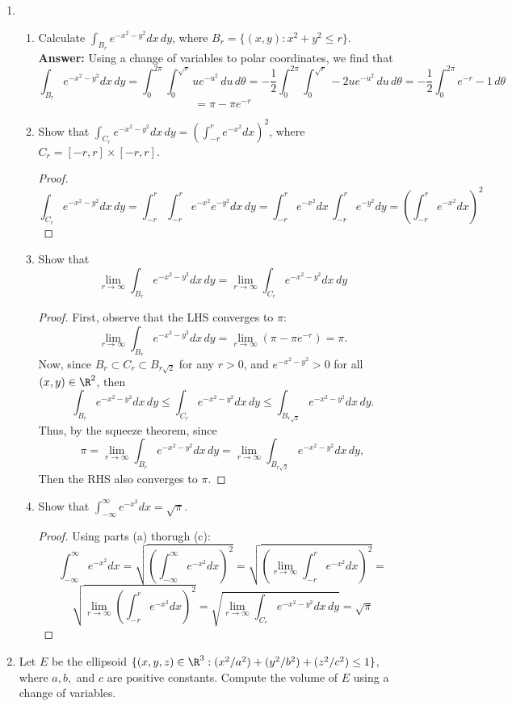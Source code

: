 \documentclass[letterpaper]{article}
\begin{document}
\begin{enumerate}
\pagebreak
\item \begin{enumerate}
\item Calculate $\int_{B_r} e^{-x^2-y^2} dx \, dy$, where $B_r=\{(x,y): x^2+y^2\leq r\}$. \\
\textbf{Answer:} Using a change of variables to polar coordinates, we find that 
$$\int_{B_r} e^{-x^2-y^2} dx \, dy = \int_0^{2\pi}\int_0^{\sqrt{r}}u e^{-u^2}\, du\, d\theta = -\frac{1}{2} \int_0^{2\pi}\int_0^{\sqrt{r}}-2u e^{-u^2}\, du\, d\theta= -\frac{1}{2} \int_0^{2\pi} e^{-r}-1\, d\theta$$
$$=\pi-\pi e^{-r}$$
\item Show that $\int_{C_r} e^{-x^2-y^2} dx \, dy = (\int_{-r}^r e^{-x^2} dx)^2$, where $C_r=[-r,r]\times[-r,r]$. 
\begin{proof}
$$\int_{C_r} e^{-x^2-y^2} dx \, dy = \int_{-r}^r\int_{-r}^r e^{-x^2}e^{-y^2} dx \, dy= \int_{-r}^r e^{-x^2} dx\, \int_{-r}^r e^{-y^2} dy=\left(\int_{-r}^r e^{-x^2} dx\right)^2$$
\end{proof}
\item Show that 
$$\lim_{r\to\infty} \int_{B_r} e^{-x^2-y^2} dx \, dy = \lim_{r\to\infty} \int_{C_r} e^{-x^2-y^2} dx \, dy$$
\begin{proof} First, observe that the LHS converges to $\pi$:
$$\lim_{r\to\infty} \int_{B_r} e^{-x^2-y^2} dx \, dy = \lim_{r\to\infty} \left(\pi-\pi e^{-r}\right) = \pi.$$
Now, since $B_r\subset C_r\subset B_{r\sqrt{2}}$ for any $r>0$, and $e^{-x^2-y^2}>0$ for all $(x,y)\in\R^2$, then 
$$\int_{B_r} e^{-x^2-y^2} dx \, dy \leq \int_{C_r} e^{-x^2-y^2} dx \, dy \leq \int_{B_{r\sqrt{2}}} e^{-x^2-y^2} dx \, dy.$$
Thus, by the squeeze theorem, since 
$$\pi = \lim_{r\to\infty} \int_{B_r} e^{-x^2-y^2} dx \, dy =\lim_{r\to\infty} \int_{B_{r\sqrt{2}}} e^{-x^2-y^2} dx \, dy,$$
Then the RHS also converges to $\pi$. 
\end{proof}
\item Show that $\int_{-\infty}^\infty e^{-x^2} dx = \sqrt{\pi}$. 
\begin{proof} Using parts (a) thorugh (c):
$$\int_{-\infty}^\infty e^{-x^2} dx = \sqrt{\left(\int_{-\infty}^\infty e^{-x^2} dx\right)^2}=\sqrt{\left(\lim_{r\to\infty}\int_{-r}^r e^{-x^2} dx\right)^2}=$$
$$\sqrt{\lim_{r\to\infty}\left(\int_{-r}^r e^{-x^2} dx\right)^2}=\sqrt{\lim_{r\to\infty}\int_{C_r} e^{-x^2-y^2} dx \, dy}= \sqrt{\pi}$$
\end{proof}
\end{enumerate}

\item Let $E$  be the ellipsoid $\{(x,y,z)\in\R^3: (x^2/a^2)+(y^2/b^2)+(z^2/c^2)\leq 1\}$, where $a,b,$ and $c$ are positive constants. Compute the volume of $E$ using a change of variables. 


\end{enumerate}
\end{document}

